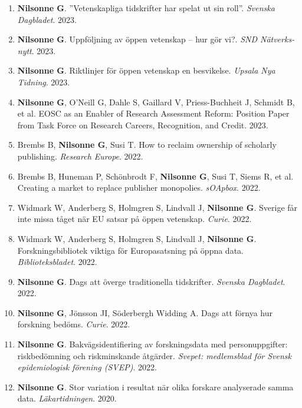 \documentclass[11pt,a4paper]{article}
\begin{document}
\begin{enumerate}
\item \textbf{Nilsonne G}. ”Vetenskapliga tidskrifter har spelat ut sin roll”. \textit{Svenska Dagbladet}. 2023.

\item \textbf{Nilsonne G}. Uppföljning av öppen vetenskap – hur gör vi?. \textit{SND Nätverks-nytt}. 2023.

\item \textbf{Nilsonne G}. Riktlinjer för öppen vetenskap en besvikelse. \textit{Upsala Nya Tidning}. 2023.

\item \textbf{Nilsonne G}, O'Neill G, Dahle S, Gaillard V, Priess-Buchheit J, Schmidt B, et al. EOSC as an Enabler of Research Assessment Reform: Position Paper from Task Force on Research Careers, Recognition, and Credit. 2023.

\item Brembs B, \textbf{Nilsonne G}, Susi T. How to reclaim ownership of scholarly publishing. \textit{Research Europe}. 2022.

\item Brembs B, Huneman P, Schönbrodt F, \textbf{Nilsonne G}, Susi T, Siems R, et al. Creating a market to replace publisher monopolies. \textit{sOApbox}. 2022.

\item Widmark W, Anderberg S, Holmgren S, Lindvall J, \textbf{Nilsonne G}. Sverige får inte missa tåget när EU satsar på öppen vetenskap. \textit{Curie}. 2022.

\item Widmark W, Anderberg S, Holmgren S, Lindvall J, \textbf{Nilsonne G}. Forskningsbibliotek viktiga för Europasatsning på öppna data. \textit{Biblioteksbladet}. 2022.

\item \textbf{Nilsonne G}. Dags att överge traditionella tidskrifter. \textit{Svenska Dagbladet}. 2022.

\item \textbf{Nilsonne G}, Jönsson JI, Söderbergh Widding A. Dags att förnya hur forskning bedöms. \textit{Curie}. 2022.

\item \textbf{Nilsonne G}. Bakvägsidentifiering av forskningsdata med personuppgifter: riskbedömning och riskminskande åtgärder. \textit{Svepet: medlemsblad för Svensk epidemiologisk förening (SVEP)}. 2022.

\item \textbf{Nilsonne G}. Stor variation i resultat när olika forskare analyserade samma data. \textit{Läkartidningen}. 2020.


\end{enumerate}
\end{document}
